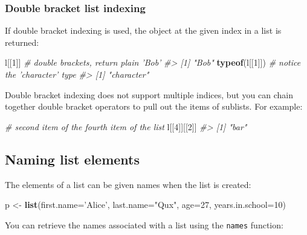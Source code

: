 \documentclass[]{book}
\newenvironment{Shaded}{\begin{snugshade}}{\end{snugshade}}
\newcommand{\CommentTok}[1]{\textcolor[rgb]{0.56,0.35,0.01}{\textit{#1}}}
\newcommand{\DataTypeTok}[1]{\textcolor[rgb]{0.13,0.29,0.53}{#1}}
\newcommand{\DecValTok}[1]{\textcolor[rgb]{0.00,0.00,0.81}{#1}}
\newcommand{\KeywordTok}[1]{\textcolor[rgb]{0.13,0.29,0.53}{\textbf{#1}}}
\newcommand{\NormalTok}[1]{#1}
\newcommand{\StringTok}[1]{\textcolor[rgb]{0.31,0.60,0.02}{#1}}
\theoremstyle{definition}
\theoremstyle{definition}
\theoremstyle{definition}
\theoremstyle{remark}
\begin{document}
\hypertarget{double-bracket-list-indexing}{%
\subsubsection{Double bracket list
indexing}\label{double-bracket-list-indexing}}

If double bracket indexing is used, the object at the given index in a
list is returned:

\begin{Shaded}
\begin{Highlighting}[]
\NormalTok{l[[}\DecValTok{1}\NormalTok{]]         }\CommentTok{# double brackets, return plain 'Bob'}
\CommentTok{#> [1] "Bob"}
\KeywordTok{typeof}\NormalTok{(l[[}\DecValTok{1}\NormalTok{]]) }\CommentTok{# notice the 'character' type}
\CommentTok{#> [1] "character"}
\end{Highlighting}
\end{Shaded}

Double bracket indexing does not support multiple indices, but you can
chain together double bracket operators to pull out the items of
sublists. For example:

\begin{Shaded}
\begin{Highlighting}[]
\CommentTok{# second item of the fourth item of the list}
\NormalTok{l[[}\DecValTok{4}\NormalTok{]][[}\DecValTok{2}\NormalTok{]]  }
\CommentTok{#> [1] "bar"}
\end{Highlighting}
\end{Shaded}

\hypertarget{naming-list-elements}{%
\subsection{Naming list elements}\label{naming-list-elements}}

The elements of a list can be given names when the list is created:

\begin{Shaded}
\begin{Highlighting}[]
\NormalTok{p <-}\StringTok{ }\KeywordTok{list}\NormalTok{(}\DataTypeTok{first.name=}\StringTok{'Alice'}\NormalTok{, }\DataTypeTok{last.name=}\StringTok{"Qux"}\NormalTok{, }\DataTypeTok{age=}\DecValTok{27}\NormalTok{, }\DataTypeTok{years.in.school=}\DecValTok{10}\NormalTok{)}
\end{Highlighting}
\end{Shaded}

You can retrieve the names associated with a list using the
\texttt{names} function:
\end{document}
